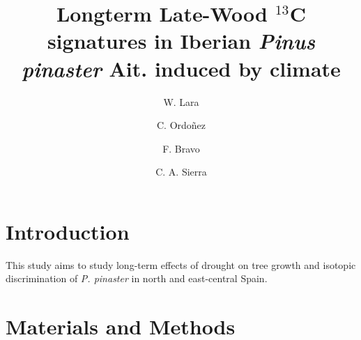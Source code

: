 \documentclass[review,authoryear]{elsarticle}
\begin{document}
\begin{frontmatter}
  \title{\textbf{Longterm Late-Wood $^{13}$C signatures in Iberian
      \textit{Pinus pinaster} Ait. induced by climate}}

\author[aut1,aut2]{W. Lara}
\author[aut1]{C. Ordo{\~n}ez}
\author[aut1]{F. Bravo}
\author[aut1]{C. A.  Sierra }


\address[aut1]{Sustainable Forest Management Research
  Institute,UVA-INIA, Avenida Madrid, s/n, 34071, Palencia, Spain}

\address[focal]{Department of Biogeochemical Processes, Max Planck
  Institute for Biogeochemistry, Hans-Kn\"oll-Stra\ss e 10, 07745,
  Jena, Germany}

\address[aut2]{Research Center on Ecosystems and Global Change,
  Carbono \& Bosques $($C\&B$)$, Calle 51A, N$^o$ 72-23, Int: 601,
  050034, Medell{\'i}n, Colombia}

\begin{abstract}
\end{abstract}
\begin{keyword}
\end{keyword}
\end{frontmatter}

\linenumbers
\section{Introduction}\label{sec:intro}

This study aims to study long-term effects of drought on tree growth
and isotopic discrimination of \textit{P. pinaster} in north and
east-central Spain.



\section{Materials and Methods}
\end{document}
